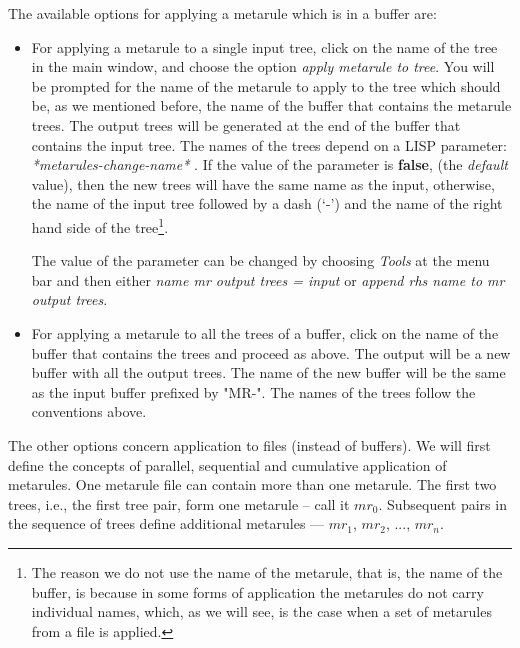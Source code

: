 The available options for applying a metarule which is in a buffer are:

\begin{itemize}
\item   For applying a metarule to a single input tree, click on the name of
	the tree in the main window, and choose the option {\it apply metarule
        to tree}.  You will be prompted for the name of the metarule to apply
        to the tree which should be, as we mentioned before, the name of the
        buffer that contains the metarule trees. The output trees will be
        generated at the end of the buffer that contains the input tree. The
        names of the trees depend on a LISP parameter: {\it
        *metarules-change-name* }.  If the value of the parameter is {\bf
        false}, (the {\it default} value), then the new trees will have the
        same name as the input, otherwise, the name of the input tree followed
        by a dash (`-') and the name of the right hand side of the
        tree\footnote{The reason we do not use the name of the metarule, that
        is, the name of the buffer, is because in some forms of application the
        metarules do not carry individual names, which, as we will see, is the
        case when a set of metarules from a file is applied.}.

        The value of the parameter can be changed by choosing {\it Tools} 
        at the menu bar and then either {\it name mr output trees =
        input}  or {\it append rhs name to mr output trees}.

        
\item   For applying a metarule to all the trees of a buffer, click on the name
	of the buffer that contains the trees and proceed as above. The output
        will be a new buffer with all the output trees. The name of the new
        buffer will be the same as the input buffer prefixed by "MR-". The
        names of the trees follow the conventions above.

\end{itemize}

The other options concern application to files (instead of buffers). 
We will first define
the concepts of parallel, sequential and cumulative application of metarules. 
One metarule 
file can contain more than one metarule. The first two trees, i.e., the first
tree pair, form one metarule -- call it $mr_0$. Subsequent pairs in the
sequence of trees define additional metarules --- 
$mr_1$, $mr_2$, ..., $mr_n$.

